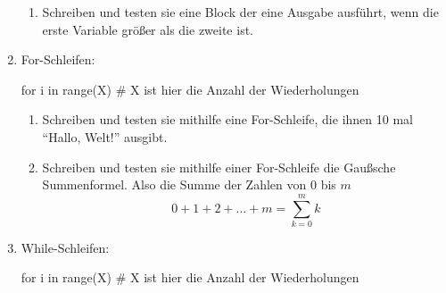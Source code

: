\documentclass[paper=a4,fontsize=11pt]{scrartcl}%
\numberwithin{equation}{section}
\begin{document}
\begin{enumerate}
\begin{enumerate}
		\item Schreiben und testen sie eine Block der eine Ausgabe ausführt, wenn die erste Variable größer als die zweite ist.
	\end{enumerate}
	\item For-Schleifen:
\begin{python}
for i in range(X) # X ist hier die Anzahl der Wiederholungen
\end{python}
	\begin{enumerate}
		\item Schreiben und testen sie mithilfe eine For-Schleife, die ihnen 10 mal \enquote{Hallo, Welt!} ausgibt.
		\item Schreiben und testen sie mithilfe einer For-Schleife die Gaußsche Summenformel. Also die Summe der Zahlen von $0$ bis $m$
		$$ 0 + 1 + 2 + ... + m = \sum_{k=0}^m k$$
	\end{enumerate}
\item While-Schleifen:
\begin{python}
for i in range(X) # X ist hier die Anzahl der Wiederholungen
\end{python}
\end{enumerate}
\end{document}
